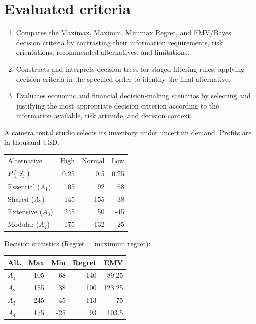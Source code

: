 \section*{Evaluated criteria}
\begin{enumerate}[label=\textbf{C\arabic*},start=8]
\item Compares the Maximax, Maximin, Minimax Regret, and EMV/Bayes decision criteria by contrasting their information requirements, risk orientations, recommended alternatives, and limitations.
\item Constructs and interprets decision trees for staged filtering rules, applying decision criteria in the specified order to identify the final alternative.
\item Evaluates economic and financial decision-making scenarios by selecting and justifying the most appropriate decision criterion according to the information available, risk attitude, and decision context.
\end{enumerate}



A camera rental studio selects its inventory under uncertain demand. Profits are in thousand USD.

\vspace{-3mm}
\begin{center}\small\setlength{\tabcolsep}{4pt}
	\begin{tabular}{lrrr}\toprule
		Alternative & High & Normal & Low\\
		$P(S_j)$ & 0.25 & 0.5 & 0.25\\ \midrule
				Essential ($A_1$) & 105 & 92 & 68\\
		Shared ($A_2$) & 145 & 155 & 38\\
		Extensive ($A_3$) & 245 & 50 & -45\\
		Modular ($A_4$) & 175 & 132 & -25\\
		\bottomrule
	\end{tabular}
\end{center} \vspace*{-3mm}

Decision statistics (Regret = maximum regret):

\vspace{-3mm}
\begin{center}\small\setlength{\tabcolsep}{4pt}
	\begin{tabular}{lrrrr}\toprule
		Alt. & Max & Min & Regret & EMV\\ \midrule
				$A_1$ & 105 & 68 & 140 & 89.25\\
		$A_2$ & 155 & 38 & 100 & 123.25\\
		$A_3$ & 245 & -45 & 113 & 75\\
		$A_4$ & 175 & -25 & 93 & 103.5\\
		\bottomrule
	\end{tabular}
\end{center}
\vspace{-3mm}

